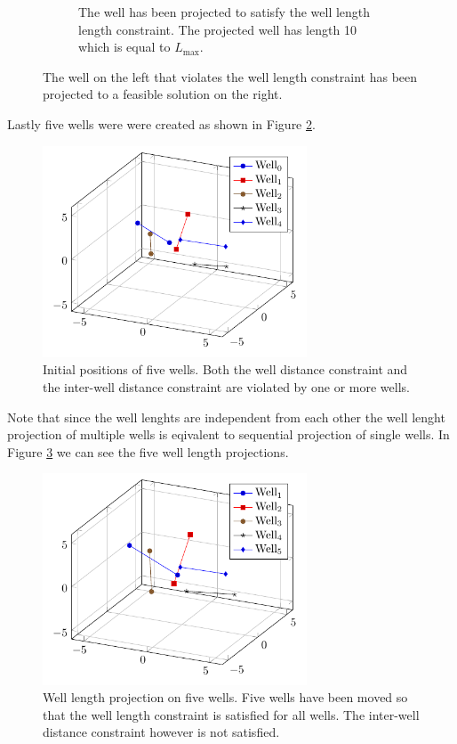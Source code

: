 \begin{figure}[H]
\begin{subfigure}{0.44\textwidth}
		\caption{The well has been projected to satisfy the well length length constraint.
				  The projected well has length 10 which is equal to $L_{\max}$.}
	\end{subfigure}
	\caption{The well on the left that violates the well length constraint
			 has been projected to a feasible solution on the right.}
	\label{fig:trivial_max}
\end{figure}
%
Lastly five wells were were created as shown in Figure \ref{fig:initial_5_well}.
%
\begin{figure}[H]
	\centering
	\includegraphics[width=0.70\textwidth]{figures/interwell_distance/five_wells.pdf}
	\caption{Initial positions of five wells. Both the well distance constraint and the
											  inter-well distance constraint are violated
											  by one or more wells.}
	\label{fig:initial_5_well}
\end{figure}
%
Note that since the well lenghts are independent from
each other the well lenght projection of multiple wells is
eqivalent to sequential projection of single wells.
In Figure \ref{fig:initial_5_well_length} we can see the
five well length projections.
%
\begin{figure}[H]
	\centering
	\includegraphics[width=0.70\textwidth]{figures/well_length/well_length_moved.pdf}
	\caption{Well length projection on five wells. Five wells have been moved so that the well
										length constraint is satisfied for all wells.
										The inter-well distance constraint however is
										not satisfied.}
	\label{fig:initial_5_well_length}
\end{figure}
%
